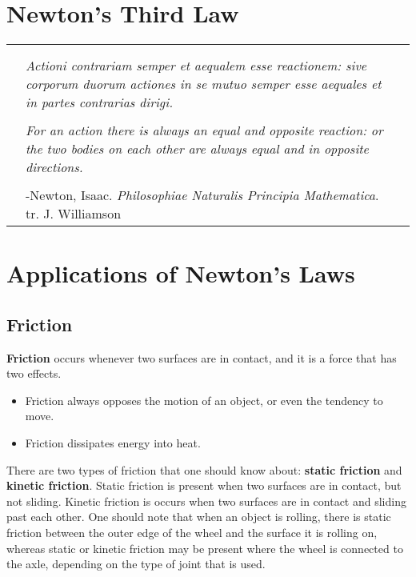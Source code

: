 	 
	
	\section{Newton's Third Law}
		\begin{tabular}{p{.75in} p{4.5in} p{.75in}}
		&  &  \\
		& & \\
		& \textit{Actioni contrariam semper et aequalem esse reactionem: sive corporum duorum actiones in se mutuo semper esse aequales et in partes contrarias dirigi. } & \\
		& & \\
		& \textit{For an action there is always an equal and opposite reaction: or the two bodies on each other are always equal and in opposite directions. } & \\
		& & \\
		 & {-Newton, Isaac.  \textit{Philosophiae Naturalis Principia Mathematica}.  tr. J. Williamson} & \\
		
	\end{tabular}
	
	\section{Applications of Newton's Laws}
		\subsection{Friction}
		\textbf{Friction} occurs whenever two surfaces are in contact, and it is a force that has two effects.  
		\begin{itemize}
			\item Friction always opposes the motion of an object, or even the tendency to move.
			\item Friction dissipates energy into heat.
		\end{itemize}
		
		 
		There are two types of friction that one should know about: \textbf{static friction} and \textbf{kinetic friction}.  Static friction is present when two surfaces are in contact, but not sliding.  Kinetic friction is occurs when two surfaces are in contact and sliding past each other.  One should note that when an object is rolling, there is static friction between the outer edge of the wheel and the surface it is rolling on, whereas static or kinetic friction may be present where the wheel is connected to the axle, depending on the type of joint that is used.  
		
